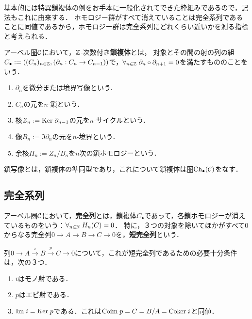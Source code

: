 \documentclass[uplatex,dvipdfmx]{jsreport}
\begin{document}
\begin{tcolorbox}[colframe=ForestGreen, colback=ForestGreen!10!white,breakable,colbacktitle=ForestGreen!40!white,coltitle=black,fonttitle=\bfseries\sffamily,
title=]
    基本的には特異鎖複体の例をお手本に一般化されてできた枠組みであるので，記法もこれに由来する．
    ホモロジー群がすべて消えていることは完全系列であることに同値であるから，ホモロジー群は完全系列にどれくらい近いかを測る指標と考えられる．
\end{tcolorbox}

\begin{definition}
    アーベル圏$\mathcal{C}$において，$\mathbb{Z}$-次数付き\textbf{鎖複体}とは，
    対象とその間の射の列の組$C_\bullet:=((C_n)_{n\in\mathbb{Z}},(\partial_n:C_n\to C_{n-1}))$で，$\forall_{n\in\mathbb{Z}}\;\partial_n\circ\partial_{n+1}=0$を満たすもののことをいう．
    \begin{enumerate}
        \item $\partial_n$を微分または境界写像という．
        \item $C_n$の元を$n$-鎖という．
        \item 核$Z_n:=\mathrm{Ker}\;\partial_{n-1}$の元を$n$-サイクルという．
        \item 像$B_n:=\Im\partial_n$の元を$n$-境界という．
        \item 余核$H_n:=Z_n/B_n$を$n$次の鎖ホモロジーという．
    \end{enumerate}
\end{definition}

\begin{definition}
    鎖写像とは，鎖複体の準同型であり，これについて鎖複体は圏$\mathrm{Ch}_\bullet(\mathcal{C})$をなす．
\end{definition}

\subsection{完全系列}

\begin{definition}
    アーベル圏$\mathcal{C}$において，\textbf{完全列}とは，鎖複体$C_\bullet$であって，各鎖ホモロジーが消えているものをいう：$\forall_{n\in\mathbb{N}}\;H_n(C)=0$．
    特に，３つの対象を除いてほかがすべて$0$からなる完全列$0\to A\to B\to C\to 0$を，\textbf{短完全列}という．
\end{definition}

\begin{proposition}[短完全列であることの特徴付け]
    列$0\to A\xrightarrow{i}B\xrightarrow{p}C\to 0$について，これが短完全列であるための必要十分条件は，次の３つ．
    \begin{enumerate}
        \item $i$はモノ射である．
        \item $p$はエピ射である．
        \item $\mathrm{Im}\; i=\mathrm{Ker}\; p$である．これは$\mathrm{Coim}\; p=C=B/A=\mathrm{Coker}\; i$と同値．
    \end{enumerate}
\end{proposition}
\end{document}

